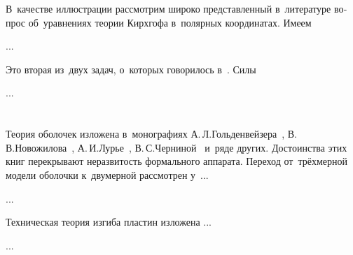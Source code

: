 \begin{otherlanguage}{russian}

В~качестве иллюстрации рассмотрим широко представленный в~литературе вопрос об~уравнениях теории Кирхгофа в~полярных координатах. Имеем

...



\end{otherlanguage}



\begin{otherlanguage}{russian}

Это вторая из~двух задач, о~которых говорилось в~. Силы

...




\end{otherlanguage}

\vspace{8mm}
\hfill\begin{minipage}[b]{0.95\linewidth}
\fontsize{10}{12}\selectfont

\section*{\wordforbibliography}

\begin{otherlanguage}{russian}

Теория оболочек изложена в~монографиях А.\,Л.\;Гольденвейзера~\cite{goldenveizer-thinshells}, В.\,В.\;Новожилова~\cite{novozhilov-theoryofthinshells}, А.\,И.\;Лурье~\cite{lurie-thinwalledshells}, В.\,С.\;Черниной~\cite{chernina-thinwalledshells} и~ряде других. Достоинства этих книг перекрывают неразвитость формального аппарата. Переход от~трёхмерной модели оболочки к~двумерной рассмотрен у~...

...

Техническая теория изгиба пластин изложена ...

...

\end{otherlanguage}

\end{minipage}
